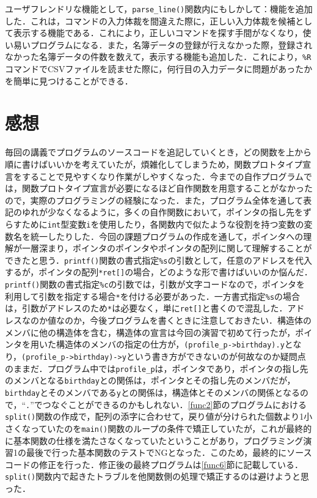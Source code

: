 ユーザフレンドリな機能として，\verb|parse_line()|関数内にもしかして：機能を追加した．これは，コマンドの入力体裁を間違えた際に，正しい入力体裁を候補として表示する機能である．これにより，正しいコマンドを探す手間がなくなり，使い易いプログラムになる．また，名簿データの登録が行えなかった際，登録されなかった名簿データの件数を数えて，表示する機能も追加した．これにより，\verb|%R|コマンドでCSVファイルを読ませた際に，何行目の入力データに問題があったかを簡単に見つけることができる．

\section{感想}\label{sec:review}

毎回の講義でプログラムのソースコードを追記していくとき，どの関数を上から順に書けばいいかを考えていたが，煩雑化してしまうため，関数プロトタイプ宣言をすることで見やすくなり作業がしやすくなった\cite{book:meikai}．今までの自作プログラムでは，関数プロトタイプ宣言が必要になるほど自作関数を用意することがなかったので，実際のプログラミングの経験になった．また，プログラム全体を通して表記のゆれが少なくなるように，多くの自作関数において，ポインタの指し先をずらすために\verb|int|型変数\verb|i|を使用したり，各関数内で似たような役割を持つ変数の変数名を統一したりした．今回の課題プログラムの作成を通して，ポインタへの理解が一層深まり，ポインタのポインタやポインタの配列に関して理解することができたと思う\cite{www:label3,www:label4}．\verb|printf()|関数の書式指定\verb|%s|の引数として，任意のアドレスを代入するが，ポインタの配列\verb|*ret[]|の場合，どのような形で書けばいいのか悩んだ．\verb|printf()|関数の書式指定\verb|%c|の引数では，引数が文字コードなので，ポインタを利用して引数を指定する場合\verb|*|を付ける必要があった．一方書式指定\verb|%s|の場合は，引数がアドレスのため\verb|*|は必要なく，単に\verb|ret[]|と書くので混乱した．アドレスなのか値なのか，今後プログラムを書くときに注意しておきたい．構造体のメンバに他の構造体を含む，構造体の宣言は今回の演習で初めて行ったが，ポインタを用いた構造体のメンバの指定の仕方が，\verb|(profile_p->birthday).y|となり，\verb|(profile_p->birthday)->y|という書き方ができないのが何故なのか疑問点のままだ．プログラム中では\verb|profile_p|は，ポインタであり，ポインタの指し先のメンバとなる\verb|birthday|との関係は，ポインタとその指し先のメンバだが，\verb|birthday|とそのメンバである\verb|y|との関係は，構造体とそのメンバの関係となるので，“\verb|.|”でつなぐことができるのかもしれない．\ref{func2}節のプログラムにおける\verb|split()|関数の作成で，配列の添字に合わせて，戻り値が分けられた個数より1小さくなっていたのを\verb|main()|関数のループの条件で矯正していたが，これが最終的に基本関数の仕様を満たさなくなっていたということがあり，プログラミング演習1の最後で行った基本関数のテストでNGとなった．このため，最終的にソースコードの修正を行った．修正後の最終プログラムは\ref{func6}節に記載している．\verb|split()|関数内で起きたトラブルを他関数側の処理で矯正するのは避けようと思った．

